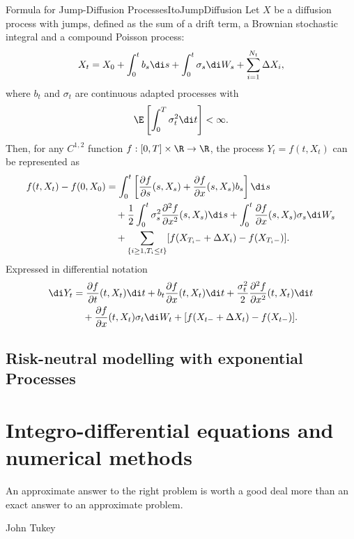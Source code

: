 \begin{prop}{\Ito{} Formula for Jump-Diffusion Processes}{ItoJumpDiffusion}
	Let \(X\) be a diffusion process with jumps, defined as the sum of a drift term, a Brownian stochastic integral and a compound Poisson process:
	\begin{equation*}
		X_t = X_0 + \int_0^t b_s \di s + \int_0^t \sigma_s \di W_s + \sum_{i=1}^{N_t} \Delta X_i,
	\end{equation*}
	where \(b_t\) and \(\sigma_t\) are continuous adapted processes with
	\begin{equation*}
		\E\left[ \int_0^T \sigma_t^2 \di t \right] < \infty.
	\end{equation*}
	Then, for any \(C^{1,2}\) function \(f : [0,T] \times \R \to \R\), the process \(Y_t = f(t, X_t)\) can be represented as
	\begin{align*}
		f(t, X_t) - f(0, X_0) & = \int_0^t \left[ \frac{\partial f}{\partial s}(s, X_s) + \frac{\partial f}{\partial x}(s, X_s)b_s \right] \di s                                        \\
		                      & \quad + \frac{1}{2} \int_0^t \sigma_s^2 \frac{\partial^2 f}{\partial x^2}(s, X_s)\di s + \int_0^t \frac{\partial f}{\partial x}(s, X_s)\sigma_s \di W_s \\
		                      & \quad + \sum_{\{i \ge 1, T_i \le t\}} [f(X_{T_i-} + \Delta X_i) - f(X_{T_i-})].
	\end{align*}
	Expressed in differential notation
	\begin{align*}
		\di Y_t & = \frac{\partial f}{\partial t}(t, X_t) \di t + b_t \frac{\partial f}{\partial x}(t, X_t) \di t + \frac{\sigma_t^2}{2} \frac{\partial^2 f}{\partial x^2}(t, X_t) \di t \\
		        & \quad + \frac{\partial f}{\partial x}(t, X_t) \sigma_t \di W_t + [f(X_{t-} + \Delta X_t) - f(X_{t-})].
	\end{align*}
\end{prop}

\subsection{Risk-neutral modelling with exponential \Levy{} Processes}

\section{Integro-differential equations and numerical methods}
\epigraph{An approximate answer to the right problem is worth a good deal more than an exact answer to an approximate problem.}{John Tukey}

